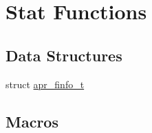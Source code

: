 \hypertarget{group__apr__file__stat}{}\section{Stat Functions}
\label{group__apr__file__stat}
\subsection*{Data Structures}
\begin{DoxyCompactItemize}
\item 
struct \hyperlink{structapr__finfo__t}{apr\+\_\+finfo\+\_\+t}
\end{DoxyCompactItemize}
\subsection*{Macros}
